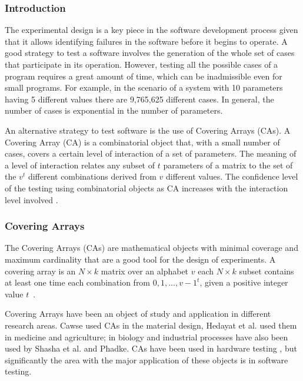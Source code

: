 \subsubsection{Introduction}
The experimental design is a key piece in the software development process given that it allows identifying failures in the software before it begins to operate. A good strategy to test a software involves the generation of the whole set of cases that participate in its operation. However, testing all the possible cases of a program requires a great amount of time, which can be inadmissible even for small programs\cite{Cohen:2003}. For example, in the scenario of a system with 10 parameters having 5 different values there are 9,765,625 different cases. In general, the number of cases is exponential in the number of parameters.

An alternative strategy to test software is the use of Covering Arrays (CAs). A Covering Array (CA) is a combinatorial object that, with a small number of cases, covers a certain level of interaction of a set of parameters. The meaning of a level of interaction relates any subset of $t$ parameters of a matrix to the set of the $v^{t}$ different combinations derived from $v$ different values. The confidence level of the testing using combinatorial objects as CA increases with the interaction level involved \cite{Kuhn:2008}.

\subsubsection{Covering Arrays}
The Covering Arrays (CAs) are mathematical objects with minimal coverage and maximum cardinality that are a good tool for the design of experiments. A covering array is an $N \times k$ matrix over an alphabet $v$ each $N \times k$ subset contains at least one time each combination from ${0,1,\ldots,v−1}^{t}$, given a positive integer value $t$~\cite{Avila-George:2012}.

Covering Arrays have been an object of study and application in different research areas. Cawse \cite{Cawse:2003} used CAs in the material design, Hedayat et al. \cite{Hedayat:1999} used them in medicine and agriculture; in biology and industrial processes have also been used by Shasha et al. \cite{Shasha:2001} and Phadke\cite{Phadke:1995}. CAs have been used in hardware testing \cite{Vadde:2004}, but significantly the area with the major application of these objects is in software testing\cite{Burr:1998,Yilmaz:2004}.

